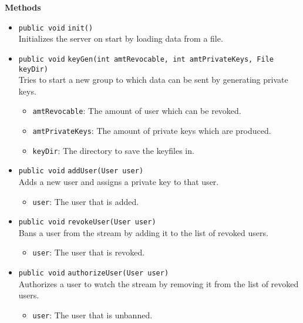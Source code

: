 \textbf{Methods}
\begin{itemize}
\item \lstinline|public void| \lstinline|init|\lstinline|()|\\
Initializes the server on start by loading data from a file.



\item \lstinline|public void| \lstinline|keyGen|\lstinline|(int amtRevocable, int amtPrivateKeys, File keyDir)|\\
Tries to start a new group to which data can be sent by generating private keys.
\begin{itemize}
\item \lstinline|amtRevocable|: The amount of user which can be revoked.
\item \lstinline|amtPrivateKeys|: The amount of private keys which are produced.
\item \lstinline|keyDir|: The directory to save the keyfiles in.
\end{itemize}



\item \lstinline|public void| \lstinline|addUser|\lstinline|(User user)|\\
Adds a new user and assigns a private key to that user.
\begin{itemize}
\item \lstinline|user|: The user that is added.
\end{itemize}



\item \lstinline|public void| \lstinline|revokeUser|\lstinline|(User user)|\\
Bans a user from the stream by adding it to the list of revoked users.
\begin{itemize}
\item \lstinline|user|: The user that is revoked.
\end{itemize}



\item \lstinline|public void| \lstinline|authorizeUser|\lstinline|(User user)|\\
Authorizes a user to watch the stream by removing it from the list of revoked users.
\begin{itemize}
\item \lstinline|user|: The user that is unbanned.
\end{itemize}




\end{itemize}
